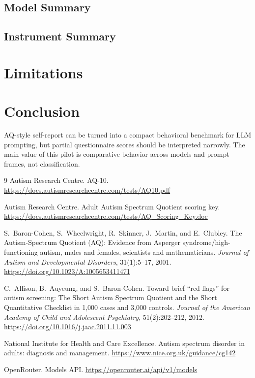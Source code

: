 \documentclass[11pt]{article}
\begin{document}
\subsection{Model Summary}
\begin{table}[H]
  \centering
  \resizebox{\textwidth}{!}{}
\end{table}

\subsection{Instrument Summary}
\begin{table}[H]
  \centering
  \resizebox{0.7\textwidth}{!}{}
\end{table}

\section{Limitations}


\section{Conclusion}
AQ-style self-report can be turned into a compact behavioral benchmark for LLM prompting, but partial questionnaire scores should be interpreted narrowly. The main value of this pilot is comparative behavior across models and prompt frames, not classification.

\begin{thebibliography}{9}
Autism Research Centre.
\newblock AQ-10.
\newblock \url{https://docs.autismresearchcentre.com/tests/AQ10.pdf}

Autism Research Centre.
\newblock Adult Autism Spectrum Quotient scoring key.
\newblock \url{https://docs.autismresearchcentre.com/tests/AQ_Scoring_Key.doc}

S.~Baron-Cohen, S.~Wheelwright, R.~Skinner, J.~Martin, and E.~Clubley.
\newblock The Autism-Spectrum Quotient (AQ): Evidence from Asperger syndrome/high-functioning autism, males and females, scientists and mathematicians.
\newblock \emph{Journal of Autism and Developmental Disorders}, 31(1):5--17, 2001.
\newblock \url{https://doi.org/10.1023/A:1005653411471}

C.~Allison, B.~Auyeung, and S.~Baron-Cohen.
\newblock Toward brief ``red flags'' for autism screening: The Short Autism Spectrum Quotient and the Short Quantitative Checklist in 1,000 cases and 3,000 controls.
\newblock \emph{Journal of the American Academy of Child and Adolescent Psychiatry}, 51(2):202--212, 2012.
\newblock \url{https://doi.org/10.1016/j.jaac.2011.11.003}

National Institute for Health and Care Excellence.
\newblock Autism spectrum disorder in adults: diagnosis and management.
\newblock \url{https://www.nice.org.uk/guidance/cg142}

OpenRouter.
\newblock Models API.
\newblock \url{https://openrouter.ai/api/v1/models}
\end{thebibliography}
\end{document}

